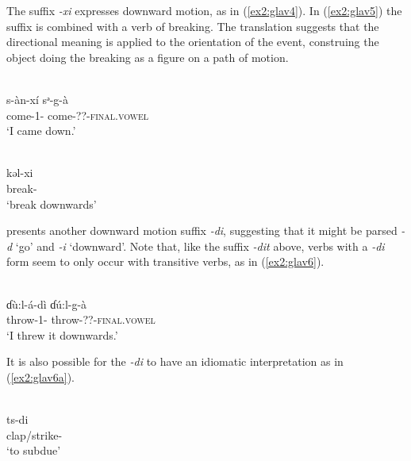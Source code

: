 The suffix \textit{-xi} expresses downward motion, as in (\ref{ex2:glav4}). In (\ref{ex2:glav5}) the suffix is combined with a verb of breaking. The translation suggests that the directional meaning is applied to the orientation of the event, construing the object doing the breaking as a figure on a path of motion. 

\ea\label{ex2:glav4}
 \\
\gll s-àn-xí	sᵊ-g-à \\
come-1-	come-??-\textsc{final.vowel}	\\
\glt `I came down.'

\ex\label{ex2:glav5}
 \\
\gll kəl-xi	\\
break-	\\
\glt `break downwards'
\z

\citet[24]{nghagyiyaSketchGlavdaGrammar2011} presents another downward motion suffix \textit{-di}, suggesting that it might be parsed \textit{-d} `go' and \textit{-i} `downward'. Note that, like the suffix \textit{-dit} above, verbs with a \textit{-di} form seem to only occur with transitive verbs, as in (\ref{ex2:glav6}). 

\ea\label{ex2:glav6}
 \\
\gll ɗù:l-á-dì	ɗú:l-g-à \\
throw-1-	throw-??-\textsc{final.vowel}	 \\
\glt `I threw it downwards.'
\z 

It is also possible for the \textit{-di} to have an idiomatic interpretation as in (\ref{ex2:glav6a}). 

\ea\label{ex2:glav6a}
 \\
\gll ts-di \\
clap/strike-	\\
\glt `to subdue'
\z


